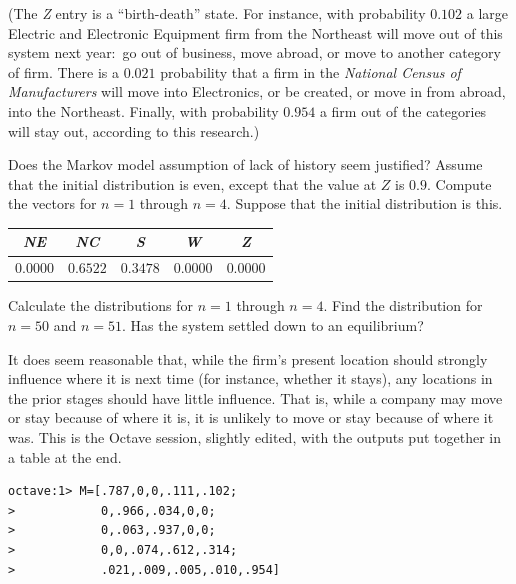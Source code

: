\begin{exercises}
    (The \textit{Z} entry is a ``birth-death'' state.
     For instance, 
     with probability $0.102$ a large Electric and Electronic Equipment
     firm from the Northeast will move out of this system next year:~go
     out of business, move abroad, or move to another category of firm.
     There is a $0.021$ probability that a firm 
     in the \emph{National Census of Manufacturers}
     will move into Electronics, or be created, or move in from abroad, 
     into the Northeast.
     Finally, with probability $0.954$ a firm out of the categories
     will stay out, according to this research.)
    \begin{exparts}
      \partsitem Does the Markov model assumption of lack of history seem
        justified?
      \partsitem Assume that the initial distribution is even, except that
        the value at $Z$ is $0.9$.
        Compute the vectors for $n=1$ through $n=4$.
      \partsitem Suppose that the initial distribution is this.
        \begin{center}
          \begin{tabular}{ccccc}
              \textit{NE}      
              &\textit{NC}      
              &\textit{S}       
              &\textit{W}       
              &\textit{Z}       \\ \hline
              $0.0000$ &$0.6522$ &$0.3478$ &$0.0000$ &$0.0000$
          \end{tabular}
        \end{center}
        Calculate the distributions for $n=1$ through $n=4$.
      \partsitem Find the distribution for $n=50$ and $n=51$.
        Has the system settled down to an equilibrium?
    \end{exparts}
    \begin{answer}
     \begin{exparts}
      \partsitem It does seem reasonable that, while the firm's present 
        location should strongly influence where it is next time (for 
        instance, whether it stays), any locations in the prior stages should
        have little influence.
        That is, while a company may move or stay because of where it is, 
        it is unlikely to move or stay because of where it was.
      \partsitem This is  the Octave session, slightly edited, with the outputs
        put together in a table at the end.
\begin{lstlisting}
octave:1> M=[.787,0,0,.111,.102;
>            0,.966,.034,0,0;
>            0,.063,.937,0,0;
>            0,0,.074,.612,.314;
>            .021,.009,.005,.010,.954]

\end{lstlisting}
\end{exparts}
\end{answer}
\end{exercises}

